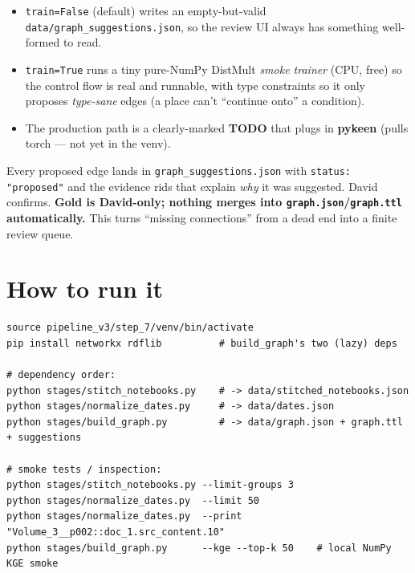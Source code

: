 \documentclass[11pt]{article}
\newcommand{\code}[1]{\texttt{\small #1}}
\begin{document}
\begin{itemize}[leftmargin=1.4em]
  \item \code{train=False} (default) writes an empty-but-valid \code{data/graph\_suggestions.json}, so
        the review UI always has something well-formed to read.
  \item \code{train=True} runs a tiny pure-NumPy DistMult \emph{smoke trainer} (CPU, free) so the
        control flow is real and runnable, with type constraints so it only proposes \emph{type-sane}
        edges (a place can't ``continue onto'' a condition).
  \item The production path is a clearly-marked \textbf{TODO} that plugs in \textbf{pykeen} (pulls
        torch --- not yet in the venv).
\end{itemize}

\begin{rulebox}
Every proposed edge lands in \code{graph\_suggestions.json} with \code{status: "proposed"} and the
evidence rids that explain \emph{why} it was suggested. David confirms. \textbf{Gold is David-only;
nothing merges into \code{graph.json}/\code{graph.ttl} automatically.} This turns ``missing
connections'' from a dead end into a finite review queue.
\end{rulebox}

\section{How to run it}

\begin{numbersbox}
\small
\begin{verbatim}
source pipeline_v3/step_7/venv/bin/activate
pip install networkx rdflib          # build_graph's two (lazy) deps

# dependency order:
python stages/stitch_notebooks.py    # -> data/stitched_notebooks.json
python stages/normalize_dates.py     # -> data/dates.json
python stages/build_graph.py         # -> data/graph.json + graph.ttl + suggestions

# smoke tests / inspection:
python stages/stitch_notebooks.py --limit-groups 3
python stages/normalize_dates.py  --limit 50
python stages/normalize_dates.py  --print "Volume_3__p002::doc_1.src_content.10"
python stages/build_graph.py      --kge --top-k 50    # local NumPy KGE smoke
\end{verbatim}
\end{numbersbox}
\end{document}
